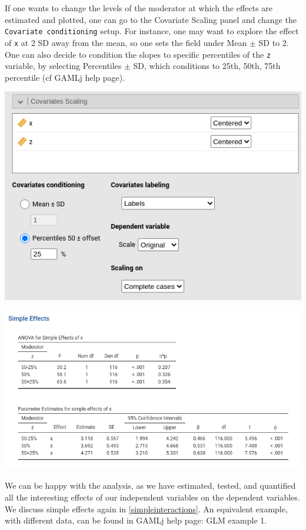 \documentclass[
]{book}
\begin{document}
If one wants to change the levels of the moderator at which the effects are estimated and plotted, one can go to the {Covariate Scaling} panel and change the \texttt{Covariate\ conditioning} setup. For instance, one may want to explore the effect of \texttt{x} at 2 SD away from the mean, so one sets the field under Mean \(\pm\) SD to 2. One can also decide to condition the slopes to specific percentiles of the \texttt{z} variable, by selecting Percentiles \(\pm\) SD, which conditions to 25th, 50th, 75th percentile (cf GAMLj help page).

\includegraphics[width=7.76in]{bookletpics/2_input14}

\includegraphics[width=10.22in]{bookletpics/2_output14}

We can be happy with the analysis, as we have estimated, tested, and quantified all the interesting effects of our independent variables on the dependent variables. We discuss simple effects again in \ref{simpleinteractions}. An equivalent example, with different data, can be found in GAMLj help page: GLM example 1.
\end{document}
